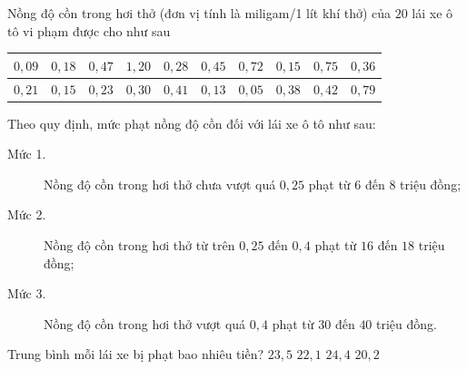 \begin{ex}%
	Nồng độ cồn trong hơi thở (đơn vị tính là miligam/1 lít khí thở) của $20$ lái xe ô tô vi phạm được cho như sau 
	\begin{center}
		\begin{longtable}{|c|c|c|c|c|c|c|c|c|c|}
			 \hline
			$0{,}09$ & $0{,}18$ & $0{,}47$ & $1{,}20$ & $0{,}28$ & $0{,}45$ & $0{,}72$ & $0{,}15$ &  $0{,}75$ & $0{,}36$\\
			 \hline
			$0{,}21$ & $0{,}15$ & $0{,}23$ & $0{,}30$ & $0{,}41$ & $0{,}13$ & $0{,}05$ & $0{,}38$ & $0{,}42$ &  $0{,}79$\\
			\hline 
		\end{longtable}
	\end{center}
	 Theo quy định, mức phạt nồng độ cồn đối với lái xe ô tô như sau:
	\begin{description}
		 \item[Mức 1.] Nồng độ cồn trong hơi thở chưa vượt quá $0{,}25$ phạt từ $6$ đến $8$ triệu đồng;
		\item[Mức 2.] Nồng độ cồn trong hơi  thở từ trên $0{,}25$ đến $0{,}4$ phạt từ $16$ đến $18$ triệu đồng;
		\item[Mức 3.] Nồng độ cồn trong hơi thở  vượt quá $0{,}4$ phạt từ $30$ đến $40$ triệu đồng.
	\end{description}
	Trung bình mỗi lái xe bị phạt  bao nhiêu tiền?
	 \choice
		{$23{,}5$} 
		 {$22{,}1$}
		 {$24{,}4$}
		{\True  $20{,}2$}
\end{ex}

